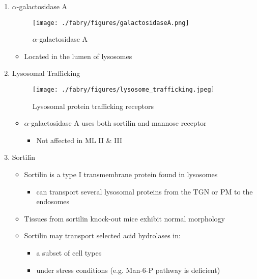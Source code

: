 \documentclass{scrartcl}
\begin{document}
\begin{enumerate}
\item \(\alpha\)-galactosidase A
\label{sec:org9d84364}
\begin{figure}[htbp]
\centering
\texttt{[image: ./fabry/figures/galactosidaseA.png]}
\caption[\(\alpha\)-galactosidase A]{\label{fig:orgf16c1f5}
\(\alpha\)-galactosidase A}
\end{figure}

\begin{itemize}
\item Located in the lumen of lysosomes
\end{itemize}

\item Lysosomal Trafficking
\label{sec:org2515d34}

\begin{figure}[htbp]
\centering
\texttt{[image: ./fabry/figures/lysosome\_trafficking.jpeg]}
\caption[Lysosomal protein trafficking receptors]{\label{fig:org1f6d606}
Lysosomal protein trafficking receptors}
\end{figure}

\begin{itemize}
\item \(\alpha\)-galactosidase A uses both sortilin and mannose receptor
\begin{itemize}
\item Not affected in ML II \& III
\end{itemize}
\end{itemize}

\item Sortilin
\label{sec:org7325495}

\begin{itemize}
\item Sortilin is a type I transmembrane protein found in lysosomes
\begin{itemize}
\item can transport several lysosomal proteins from the TGN or PM to the endosomes
\end{itemize}
\item Tissues from sortilin knock-out mice exhibit normal morphology
\item Sortilin may transport selected acid hydrolases in:
\begin{itemize}
\item a subset of cell types
\item under stress conditions (e.g. Man-6-P pathway is deficient)
\end{itemize}
\end{itemize}


\end{enumerate}
\end{document}
